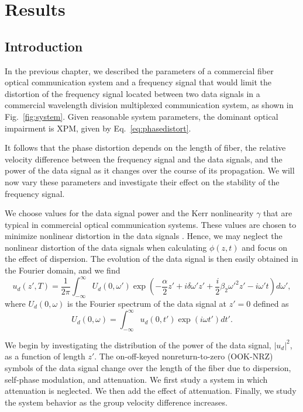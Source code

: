 \chapter{Results}
\label{chap:results}

\section{Introduction}

In the previous chapter, we described the parameters of a commercial fiber optical communication system and a frequency signal that would limit the distortion of the frequency signal located between two data signals in a commercial wavelength division multiplexed communication system, as shown in Fig.~\ref{fig:system}. Given reasonable system parameters, the dominant optical impairment is XPM, given by Eq.~\ref{eq:phasedistort}.
%


It follows that the phase distortion depends on the length of fiber, the relative velocity difference between the frequency signal and the data signals, and the power of the data signal as it changes over the course of its propagation. We will now vary these parameters and investigate their effect on the stability of the frequency signal.

We choose values for the data signal power and the Kerr nonlinearity $\gamma$ that are typical in commercial optical communication systems. These values are chosen to minimize nonlinear distortion in the data signals \cite{Agrawal2013, agrawal2012fiber}. Hence, we may neglect the nonlinear distortion of the data signals when calculating $\phi(z,t)$ and focus on the effect of dispersion. The evolution of the data signal is then easily obtained in the Fourier domain, and we find
%
\begin{equation} \label{eq:datasol}
u_d(z',T) = \frac{1}{2\pi} \int_{-\infty}^{\infty} U_d(0, \omega')\exp\left(-\frac{\alpha}{2} z' + i\delta\omega' z' + \frac{i}{2}\beta_2\omega'^2z'-i\omega' t\right) d\omega' ,
\end{equation}
%
where $U_d(0,\omega)$ is the Fourier spectrum of the data signal at $z'=0$ defined as
\begin{equation}
U_d(0,\omega) = \int_{-\infty}^{\infty} u_d(0, t')\exp(i\omega t')dt'.
\end{equation}

We begin by investigating the distribution of the power of the data signal, $|u_d|^2$, as a function of length $z'$. The on-off-keyed nonreturn-to-zero (OOK-NRZ) symbols of the data signal change over the length of the fiber due to dispersion, self-phase modulation, and attenuation. We first study a system in which attenuation is neglected. We then add the effect of attenuation. Finally, we study the system behavior as the group velocity difference increases.

